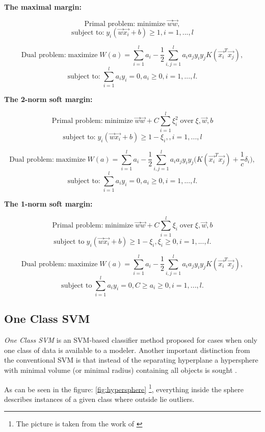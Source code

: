 \textbf{The maximal margin:}

\[\textrm{Primal problem:}\; \textrm{minimize}\; \vec{w} \vec{w},\] \[\textrm{subject to:}\; y_i(\vec{w}\vec{x_i} + b) \geq 1, i = 1, ...,l \] 

\[\textrm{Dual problem:}\; \textrm{maximize}\; W(a) =  \sum_{i=1}^{l} a_i - \frac{1}{2}\sum_{i,j = 1}^{l}a_i a_j y_i y_j K(\vec{x_i}^T \vec{x_j}), \] 
\[\textrm{subject to:}\; \sum_{i=1}^{l}a_i y_i = 0, a_i \geq 0, i = 1,...,l.\] 

\textbf{The 2-norm soft margin:}

\[\textrm{Primal problem:}\; \textrm{minimize}\; \vec{w} \vec{w} + C \sum_{i=1}^{l} \xi^2_i\; \textrm{over}\; \xi,\vec{w},b\] 
\[\textrm{subject to:}\; y_i(\vec{w}\vec{x_i} + b) \geq 1 - \xi_i,, i = 1, ...,l \] 

\[\textrm{Dual problem:}\; \textrm{maximize}\; W(a) =  \sum_{i=1}^{l} a_i - \frac{1}{2}\sum_{i,j = 1}^{l}a_i a_j y_i y_j \Big( K(\vec{x_i}^T \vec{x_j}) + \frac{1}{c}\delta_i \Big), \] 
\[\textrm{subject to:}\; \sum_{i=1}^{l}a_i y_i = 0, a_i \geq 0, i = 1,...,l.\] 

\textbf{The 1-norm soft margin:}

\[\textrm{Primal problem:}\; \textrm{minimize}\; \vec{w} \vec{w} + C \sum_{i=1}^{l} \xi_i\; \textrm{over}\; \xi,\vec{w},b\] 
\[\textrm{subject to}\; y_i(\vec{w}\vec{x_i} + b) \geq 1 - \xi_i,\xi_i \geq 0, i = 1, ...,l.\] 

\[\textrm{Dual problem:}\; \textrm{maximize}\; W(a) =  \sum_{i=1}^{l} a_i - \frac{1}{2}\sum_{i,j = 1}^{l}a_i a_j y_i y_j K(\vec{x_i}^T \vec{x_j}) , \]
\[\textrm{subject to}\; \sum_{i=1}^{l}a_i y_i = 0,C \geq a_i \geq 0, i = 1,...,l.\] 

\subsection{One Class SVM}\label{Chapter:OC-SVM}
\textit{One Class SVM} is an SVM-based classifier method proposed for cases when only one class of data is available to a modeler. Another important distinction from the conventional SVM is that instead of the separating hyperplane a hypersphere with minimal volume (or
minimal radius) containing all objects is sought \cite{Tax:2004:SVD:960091.960109}. 

As can be seen in the figure: \ref{fig:hypersphere} \footnote{The picture is taken from the work of  \cite{s120810109}}, everything inside the sphere describes instances of a given class where outside lie outliers. 

